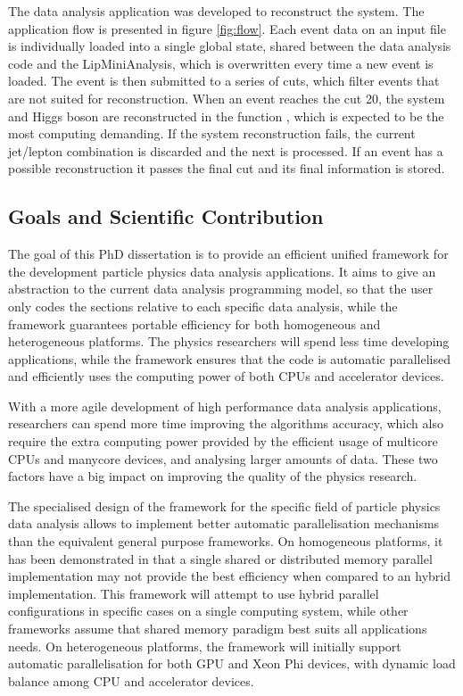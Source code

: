 The \tth data analysis application was developed to reconstruct the \ttH system. The application flow is presented in figure \ref{fig:flow}. Each event data on an input file is individually loaded into a single global state, shared between the data analysis code and the LipMiniAnalysis, which is overwritten every time a new event is loaded. The event is then submitted to a series of cuts, which filter events that are not suited for reconstruction. When an event reaches the cut 20, the \ttbar system and Higgs boson are reconstructed in the function \ttDilepKinFit, which is expected to be the most computing demanding. If the \ttbar system reconstruction fails, the current jet/lepton combination is discarded and the next is processed. If an event has a possible reconstruction it passes the final cut and its final information is stored.

\subsection{Goals and Scientific Contribution}
\label{goals}

The goal of this PhD dissertation is to provide an efficient unified framework for the development particle physics data analysis applications. It aims to give an abstraction to the current data analysis programming model, so that the user only codes the sections relative to each specific data analysis, while the framework guarantees portable efficiency for both homogeneous and heterogeneous platforms. The physics researchers will spend less time developing applications, while the framework ensures that the code is automatic parallelised and efficiently uses the computing power of both CPUs and accelerator devices.

With a more agile development of high performance data analysis applications, researchers can spend more time improving the algorithms accuracy, which also require the extra computing power provided by the efficient usage of multicore CPUs and manycore devices, and analysing larger amounts of data. These two factors have a big impact on improving the quality of the physics research.

The specialised design of the framework for the specific field of particle physics data analysis allows to implement better automatic parallelisation mechanisms than the equivalent general purpose frameworks. On homogeneous platforms, it has been demonstrated in \cite{paperAMP,Msc:AMP} that a single shared or distributed memory parallel implementation may not provide the best efficiency when compared to an hybrid implementation. This framework will attempt to use hybrid parallel configurations in specific cases on a single computing system, while other frameworks assume that shared memory paradigm best suits all applications needs. On heterogeneous platforms, the framework will initially support automatic parallelisation for both \nvidia GPU and \intel Xeon Phi devices, with dynamic load balance among CPU and accelerator devices.
